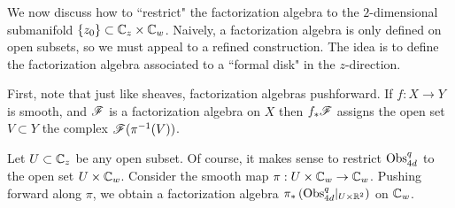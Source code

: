 \documentclass[11pt]{amsart}
\begin{document}
\subsubsection{}

We now discuss how to ``restrict" the factorization algebra to the $2$-dimensional submanifold $\{z_0\} \subset \mathbb C_z \times \mathbb C_w$.
Naively, a factorization algebra is only defined on open subsets, so we must appeal to a refined construction. 
The idea is to define the factorization algebra associated to a ``formal disk" in the $z$-direction. 

First, note that just like sheaves, factorization algebras pushforward.
If $f : X \to Y$ is smooth, and $\mathscr F$ is a factorization algebra on $X$ then $f_* \mathscr F$ assigns the open set $V \subset Y$ the complex $\mathscr F(\pi^{-1}(V))$. 

Let $U \subset \mathbb C_z$ be any open subset.
Of course, it makes sense to restrict ${\rm Obs}^{q}_{4d}$ to the open set $U \times \mathbb C_w$. 
Consider the smooth map $\pi : U \times \mathbb C_w \to \mathbb C_w$. 
Pushing forward along $\pi$, we obtain a factorization algebra $\pi_*\left({\rm Obs}^q_{4d}|_{U \times \mathbb R^2}\right)$ on $\mathbb C_w$. 
\end{document}
